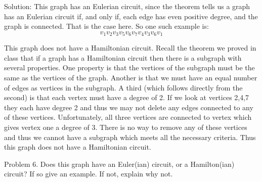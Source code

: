 \documentclass[16 pt]{amsart}
\theoremstyle{definition}
\theoremstyle{remark}
\numberwithin{equation}{subsection}
\begin{document}
\vspace{.25in}
\begin{center}



\end{center}

\vspace{1in}

Solution: This graph has an Eulerian circuit, since the theorem tells us a graph has an Eulerian circuit if, and only if, each edge has even positive degree, and the graph is connected.  That is the case here.  So one such example is:
\[
v_1 v_2 v_3 v_5 v_6 v_7 v_4 v_3 v_6 v_1
\]

This graph does not have a Hamiltonian circuit.  Recall the theorem we proved in class that if a graph has a Hamiltonian circuit then there is a subgraph with several properties.  One property is that the vertices of the subgraph must be the same as the vertices of the graph.  Another is that we must have an equal number of edges as vertices in the subgraph.  A third (which follows directly from the second) is that each vertex must have a degree of 2.  If we look at vertices 2,4,7 they each have degree 2 and thus we may not delete any edges connected to any of these vertices.  Unfortunately, all three vertices are connected to vertex which gives vertex one a degree of 3.  There is no way to remove any of these vertices and thus we cannot have a subgraph which meets all the necessary criteria.  Thus this graph does not have a Hamiltonian circuit.

\newpage

Problem 6. Does this graph have an Euler(ian) circuit, or a Hamilton(ian) circuit? If so give an example.  If not, explain why not.

\vspace{.25in}
\begin{center}

\end{center}
\end{document}
